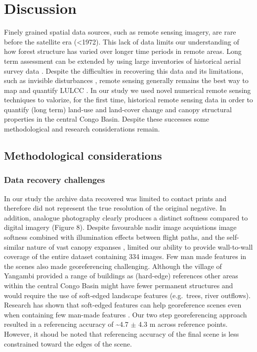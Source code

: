 \documentclass[remote sensing,article,submit,moreauthors,pdftex]{mdpi}
\begin{document}
\hypertarget{discussion}{%
\section{Discussion}\label{discussion}}

Finely grained spatial data sources, such as remote sensing imagery, are
rare before the satellite era (\textless{}1972). This lack of data
limits our understanding of how forest structure has varied over longer
time periods in remote areas. Long term assessment can be extended by
using large inventories of historical aerial survey data
\citep{kadmon1999, song2015, nita2018}. Despite the difficulties in
recovering this data and its limitations, such as invisible disturbances
\citep{peres2006}, remote sensing generally remains the best way to map
and quantify LULCC \citep{houghton2012}. In our study we used novel
numerical remote sensing techniques to valorize, for the first time,
historical remote sensing data in order to quantify (long term) land-use
and land-cover change and canopy structural properties in the central
Congo Basin. Despite these successes some methodological and research
considerations remain.

\hypertarget{methodological-considerations}{%
\subsection{Methodological
considerations}\label{methodological-considerations}}

\hypertarget{data-recovery-challenges}{%
\subsubsection{Data recovery
challenges}\label{data-recovery-challenges}}

In our study the archive data recovered was limited to contact prints
and therefore did not represent the true resolution of the original
negative. In addition, analogue photography clearly produces a distinct
softness compared to digital imagery (Figure 8). Despite favourable
nadir image acquistions \citep{verhoeven2017} image softness combined
with illumination effects between flight paths, and the self-similar
nature of vast canopy expanses \citep{park2019, simini2010, sole1995},
limited our ability to provide wall-to-wall coverage of the entire
dataset containing 334 images. Few man made features in the scenes also
made georeferencing challenging. Although the village of Yangambi
provided a range of buildings as (hard-edge) references other areas
within the central Congo Basin might have fewer permanent structures and
would require the use of soft-edged landscape features (e.g.~trees,
river outflows). Research has shown that soft-edged features can help
georeference scenes even when containing few man-made features
\citep{hughes2006}. Our two step georeferencing approach resulted in a
referencing accuracy of \textasciitilde{}4.7 \(\pm\) 4.3 m across
reference points. However, it shoud be noted that referencing accuracy
of the final scene is less constrained toward the edges of the scene.
\end{document}
